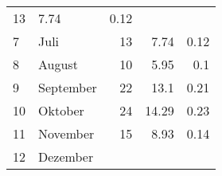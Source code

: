 \begin{longtable}{lXrrr}
       \num{13} &
       \num[round-mode=places,round-precision=2]{7.74} &
         \num[round-mode=places,round-precision=2]{0.12} \\

     7 &
     \multicolumn{1}{X}{ Juli   } &


       \num{13} &
       \num[round-mode=places,round-precision=2]{7.74} &
         \num[round-mode=places,round-precision=2]{0.12} \\

     8 &
     \multicolumn{1}{X}{ August   } &


       \num{10} &
       \num[round-mode=places,round-precision=2]{5.95} &
         \num[round-mode=places,round-precision=2]{0.1} \\

     9 &
     \multicolumn{1}{X}{ September   } &


       \num{22} &
       \num[round-mode=places,round-precision=2]{13.1} &
         \num[round-mode=places,round-precision=2]{0.21} \\

     10 &
     \multicolumn{1}{X}{ Oktober   } &


       \num{24} &
       \num[round-mode=places,round-precision=2]{14.29} &
         \num[round-mode=places,round-precision=2]{0.23} \\

     11 &
     \multicolumn{1}{X}{ November   } &


       \num{15} &
       \num[round-mode=places,round-precision=2]{8.93} &
         \num[round-mode=places,round-precision=2]{0.14} \\

     12 &
     \multicolumn{1}{X}{ Dezember   } &



\end{longtable}
